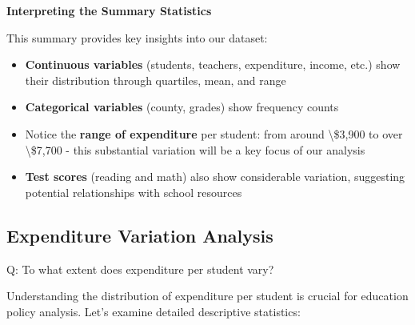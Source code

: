 \documentclass[
  12pt,
  letterpaper,
]{scrbook}
\providecommand{\tightlist}{%
  \setlength{\itemsep}{0pt}\setlength{\parskip}{0pt}}
\renewcommand{\tightlist}{\setlength{\itemsep}{0.5\baselineskip}\setlength{\parskip}{0.2\baselineskip}}
\theoremstyle{plain}
\theoremstyle{definition}
\theoremstyle{remark}
\begin{document}
\textbf{Interpreting the Summary Statistics}

This summary provides key insights into our dataset:

\begin{itemize}
\tightlist
\item
  \textbf{Continuous variables} (students, teachers, expenditure,
  income, etc.) show their distribution through quartiles, mean, and
  range
\item
  \textbf{Categorical variables} (county, grades) show frequency counts
\item
  Notice the \textbf{range of expenditure} per student: from around
  \textbackslash\$3,900 to over \textbackslash\$7,700 - this substantial
  variation will be a key focus of our analysis
\item
  \textbf{Test scores} (reading and math) also show considerable
  variation, suggesting potential relationships with school resources
\end{itemize}

\subsection{Expenditure Variation
Analysis}\label{expenditure-variation-analysis}

Q: To what extent does expenditure per student vary?

Understanding the distribution of expenditure per student is crucial for
education policy analysis. Let's examine detailed descriptive
statistics:
\end{document}
